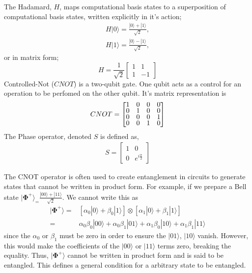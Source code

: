 The Hadamard, $H$, maps computational basis states to a superposition of computational basis states,
written explicitly in it's action;
\begin{align*}
    H |0\rangle = \frac{|0\rangle + |1\rangle}{\sqrt{2}}, \\
    H |1\rangle = \frac{|0\rangle - |1\rangle}{\sqrt{2}},
\end{align*}
or in matrix form;
\begin{equation*}
    H = \frac{1}{\sqrt{2}} \begin{bmatrix}
        1 & 1  \\
        1 & -1
    \end{bmatrix}
\end{equation*}
Controlled-Not ($CNOT$) is a two-qubit gate. One qubit acts as a control for an operation to be perfomed
on the other qubit. It's matrix representation is
\begin{align}
    \label{CNOT}
    CNOT =
    \renewcommand{\arraystretch}{0.75}
    \begin{bmatrix}
        1 & 0 & 0 & 0 \\
        0 & 1 & 0 & 0 \\
        0 & 0 & 0 & 1 \\
        0 & 0 & 1 & 0
    \end{bmatrix}
\end{align}
The Phase operator, denoted $S$ is defined as,
\begin{align*}
    S =
    \begin{bmatrix}
        1 & 0                  \\
        0 & e^{i\frac{\pi}{2}}
    \end{bmatrix}
\end{align*}

The CNOT operator is often used to create entanglement in circuits to
generate states that cannot be written in product form. For example, if we prepare a Bell state
$|{\bm\Phi}^{+}\rangle_ = \frac{|00\rangle + |11\rangle}{\sqrt{2}}$. We cannot write this as
\begin{align*}
    |{\bm\Phi}^+\rangle = & \left[ \alpha_0 |0\rangle + \beta_0|1\rangle\right] \otimes \left[\alpha_1 |0\rangle + \beta_1|1\rangle\right] \\
    =                     & \alpha_0\beta_0 |00\rangle + \alpha_0\beta_1|01\rangle + \alpha_1\beta_0|10\rangle + \alpha_1\beta_1|11\rangle
\end{align*}
since the $\alpha_0$ or $\beta_1$ must be zero in order to ensure the $|01\rangle$, $|10\rangle$ vanish.
However, this would make the coefficients of the $|00\rangle$
or $|11\rangle$ terms zero, breaking the equality. Thus, $|{\bm\Phi}^+\rangle$ cannot be written in
product form and is said to be entangled. This defines a general condition for a arbitrary state to be entangled.
